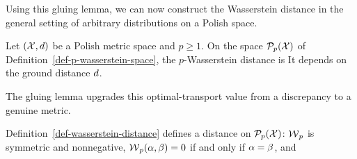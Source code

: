 Using this gluing lemma, we can now construct the Wasserstein distance in the general setting of arbitrary distributions on a Polish space.

\begin{defn}\label{def-wasserstein-distance}
Let $(\mathcal{X},d)$ be a Polish metric space and $p\geq1$. On the space $\mathcal{P}_p(\mathcal{X})$ of Definition~\ref{def-p-wasserstein-space}, the $p$-Wasserstein distance is
	It depends on the ground distance $d$.
\end{defn}

The gluing lemma upgrades this optimal-transport value from a discrepancy to a genuine metric.

\begin{prop}\label{prop-metric-measure}
	Definition~\ref{def-wasserstein-distance} defines a distance on $\mathcal{P}_p(\mathcal{X})$: $\operatorname{\mathcal{W}}_p$ is symmetric and nonnegative, $\operatorname{\mathcal{W}}_p(\alpha,\beta)=0$ if and only if $\alpha=\beta$, and
\end{prop}

